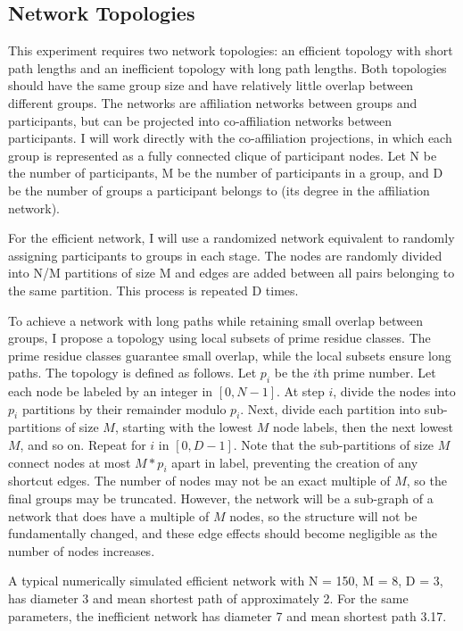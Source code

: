 \subsection{Network Topologies}
This experiment requires two network topologies: an efficient topology with short path lengths and an inefficient topology with long path lengths. Both topologies should have the same group size and have relatively little overlap between different groups. The networks are affiliation networks between groups and participants, but can be projected into co-affiliation networks between participants. I will work directly with the co-affiliation projections, in which each group is represented as a fully connected clique of participant nodes. Let N be the number of participants, M be the number of participants in a group, and D be the number of groups a participant belongs to (its degree in the affiliation network).

For the efficient network, I will use a randomized network equivalent to randomly assigning participants to groups in each stage. The nodes are randomly divided into N/M partitions of size M and edges are added between all pairs belonging to the same partition. This process is repeated D times.

To achieve a network with long paths while retaining small overlap between groups, I propose a topology using local subsets of prime residue classes. The prime residue classes guarantee small overlap, while the local subsets ensure long paths. The topology is defined as follows. Let $p_i$ be the $i$th prime number. Let each node be labeled by an integer in $[0, N-1]$. At step $i$, divide the nodes into $p_i$ partitions by their remainder modulo $p_i$. Next, divide each partition into sub-partitions of size $M$, starting with the lowest $M$ node labels, then the next lowest $M$, and so on. Repeat for $i$ in $[0, D-1]$. Note that the sub-partitions of size $M$ connect nodes at most $M*p_i$ apart in label, preventing the creation of any shortcut edges. The number of nodes may not be an exact multiple of $M$, so the final groups may be truncated. However, the network will be a sub-graph of a network that does have a multiple of $M$ nodes, so the structure will not be fundamentally changed, and these edge effects should become negligible as the number of nodes increases.

A typical numerically simulated efficient network with N = 150, M = 8, D = 3, has diameter 3 and mean shortest path of approximately 2. For the same parameters, the inefficient network has diameter 7 and mean shortest path 3.17.

